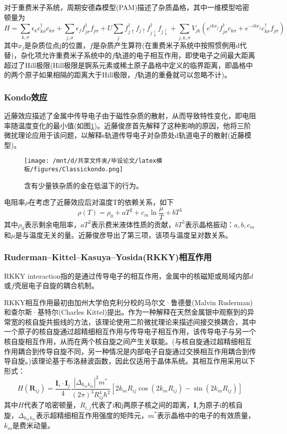 对于重费米子系统，周期安德森模型(PAM)描述了杂质晶格，其中一维模型哈密顿量为
$$
H=\sum_{k, \sigma} \epsilon_{k} c_{k \sigma}^{\dagger} c_{k \sigma}+\sum_{j, \sigma} \epsilon_{f} f_{j \sigma}^{\dagger} f_{j \sigma}+U \sum_{j} f_{j \uparrow}^{\dagger} f_{j \uparrow} f_{j \downarrow}^{\dagger} f_{j \downarrow}+\sum_{j, k, \sigma} V_{j k}\left(e^{i k x_{j}} f_{j \sigma}^{\dagger} c_{k \sigma}+e^{-i k x_{j}} c_{k \sigma}^{\dagger} f_{j \sigma}\right)
$$
其中$x_j$是杂质位点j的位置，$f$是杂质产生算符(在重费米子系统中按照惯例用d代替)，杂化项允许重费米子系统中的$f$轨道的电子相互作用，即使电子之间最大距离超过了Hill极限(Hill极限是锕系元素或稀土原子晶格中定义的临界距离，即晶格中的两个原子如果相隔的距离大于Hill极限，$f$轨道的重叠就可以忽略不计)。%

\subsubsection{Kondo效应}
近藤效应描述了金属中传导电子由于磁性杂质的散射，从而导致特性变化，即电阻率随温度变化的最小值(如图\ref{fig})。近藤俊彦首先解释了这种影响的原因\cite{3}，他将三阶微扰理论应用于该问题，以解释s轨道传导电子对杂质处d轨道电子的散射(近藤模型)。
\begin{figure}[h]
    \centering
    \texttt{[image: /mnt/d/共享文件夹/毕设论文/latex模板/figures/Classickondo.png]}
    \caption{含有少量铁杂质的金在低温下的行为\cite{4}。}
    \label{fig}
\end{figure}
电阻率$\rho$在考虑了近藤效应后对温度T的依赖关系，如下
$$
\rho(T)=\rho_{0}+a T^{2}+c_{m} \ln \frac{\mu}{T}+b T^{5}
$$
其中$\rho_0$表示剩余电阻率，$aT^2$表示费米液体性质的贡献，$bT^5$表示晶格振动：$a,b,c_m$和$\mu$是与温度无关的量。近藤俊彦导出了第三项，该项与温度呈对数关系。


\subsubsection{Ruderman–Kittel–Kasuya–Yosida(RKKY)相互作用}
RKKY interaction指的是通过传导电子的相互作用，金属中的核磁矩或局域内部$d$或$f$壳层电子自旋的耦合机制\cite{5}\cite{6}\cite{7}。

RKKY相互作用最初由加州大学伯克利分校的马尔文·鲁德曼(Malvin Ruderman)和查尔斯·基特尔(Charles Kittel)提出。作为一种解释在天然金属银中观察到的异常宽的核自旋共振线的方法，该理论使用二阶微扰理论来描述间接交换耦合，其中一个原子的核自旋通过超精细相互作用与传导电子相互作用，该传导电子与另一个核自旋相互作用，从而在两个核自旋之间产生关联能。(与核自旋通过超精细相互作用耦合到传导自旋不同，另一种情况是内部电子自旋通过交换相互作用耦合到传导自旋。)该理论基于布洛赫波函数，因此仅适用于晶体系统。其相互作用采用以下形式：
$$
H\left(\mathbf{R}_{i j}\right)=\frac{\mathbf{I}_{i} \cdot \mathbf{I}_{j}}{4} \frac{\left|\Delta_{k_{m} k_{m}}\right|^{2} m^{*}}{(2 \pi)^{3} R_{i j}^{4} \hbar^2}\left[2 k_{m} R_{i j} \cos \left(2 k_{m} R_{i j}\right)-\sin \left(2 k_{m} R_{i j}\right)\right]
$$
其中$H$代表了哈密顿量，$R_{i,j}$代表了i和j两原子核之间的距离，$\mathbf{I}_i$为原子i的核自旋，$\Delta_{k_{m}k_m}$表示超精细相互作用强度的矩阵元，$m^*$表示晶格中的电子的有效质量，$k_m$是费米动量。 







